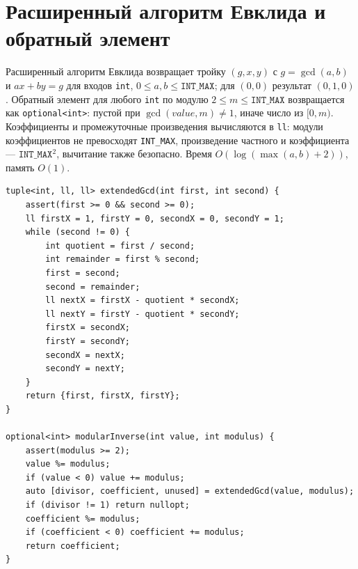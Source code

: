 \section{Расширенный алгоритм Евклида и обратный элемент}
Расширенный алгоритм Евклида возвращает тройку $(g,x,y)$ с $g=\gcd(a,b)$ и $ax+by=g$ для входов \texttt{int}, $0\le a,b\le\texttt{INT\_MAX}$; для $(0,0)$ результат $(0,1,0)$.
Обратный элемент для любого \texttt{int} по модулю $2\le m\le\texttt{INT\_MAX}$ возвращается как \texttt{optional<int>}: пустой при $\gcd(value,m)\ne1$, иначе число из $[0,m)$.
Коэффициенты и промежуточные произведения вычисляются в \texttt{ll}: модули коэффициентов не превосходят \texttt{INT\_MAX}, произведение частного и коэффициента --- $\texttt{INT\_MAX}^2$, вычитание также безопасно.
Время $O(\log(\max(a,b)+2))$, память $O(1)$.
\begin{lstlisting}[name=math_euclid]
tuple<int, ll, ll> extendedGcd(int first, int second) {
    assert(first >= 0 && second >= 0);
    ll firstX = 1, firstY = 0, secondX = 0, secondY = 1;
    while (second != 0) {
        int quotient = first / second;
        int remainder = first % second;
        first = second;
        second = remainder;
        ll nextX = firstX - quotient * secondX;
        ll nextY = firstY - quotient * secondY;
        firstX = secondX;
        firstY = secondY;
        secondX = nextX;
        secondY = nextY;
    }
    return {first, firstX, firstY};
}

optional<int> modularInverse(int value, int modulus) {
    assert(modulus >= 2);
    value %= modulus;
    if (value < 0) value += modulus;
    auto [divisor, coefficient, unused] = extendedGcd(value, modulus);
    if (divisor != 1) return nullopt;
    coefficient %= modulus;
    if (coefficient < 0) coefficient += modulus;
    return coefficient;
}
\end{lstlisting}

